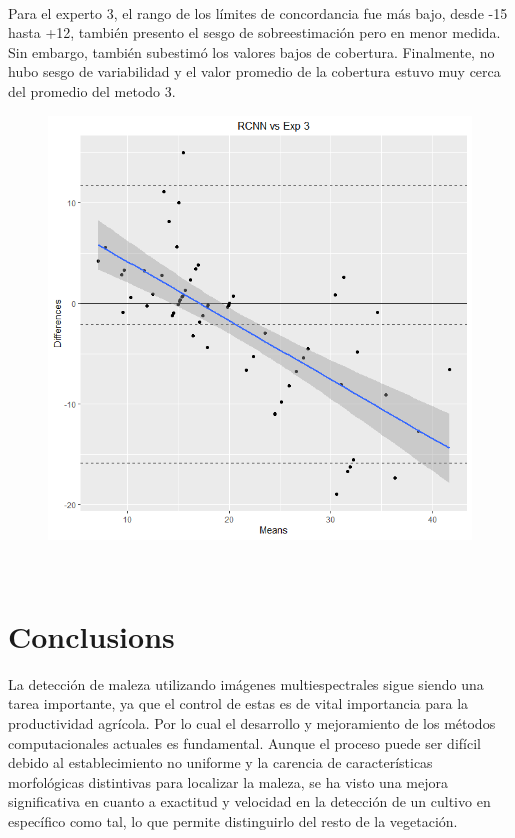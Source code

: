 \documentclass[journal,article,submit,moreauthors,pdftex]{Definitions/mdpi}
\begin{document}
\\
Para el experto 3, el rango de los límites de concordancia fue más bajo, desde -15 hasta +12, también presento el sesgo de sobreestimación pero en menor medida. Sin embargo, también subestimó los valores bajos de cobertura. Finalmente, no hubo sesgo de variabilidad y el valor promedio de la cobertura estuvo muy cerca del promedio del metodo 3.
\begin{figure}[H]
    \centering
    \includegraphics[scale=0.4]{RCNN-EXP3.png}
     \centering
    \caption{}
\end{figure}
\\
\section{Conclusions}

La detección de maleza utilizando imágenes multiespectrales sigue siendo una tarea importante, ya que el control de estas es de vital importancia para la productividad agrícola. Por lo cual el desarrollo y mejoramiento de los métodos computacionales actuales es fundamental. Aunque el proceso puede ser difícil debido al establecimiento no uniforme y la carencia de características morfológicas distintivas para localizar la maleza, se ha visto una mejora significativa en cuanto a exactitud y velocidad en la detección de un cultivo en específico como tal, lo que permite distinguirlo del resto de la vegetación. 
\end{document}
